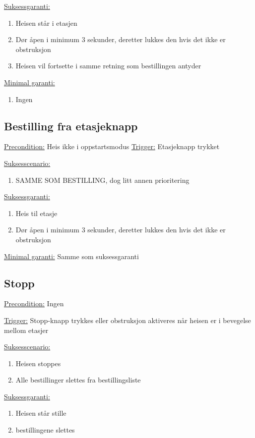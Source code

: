 \documentclass[a4paper]{article}
\begin{document}
\underline{Suksessgaranti:} 
\begin{enumerate}
\item Heisen står i etasjen
\item Dør åpen i minimum 3 sekunder, deretter lukkes den hvis det ikke er obstruksjon
\item Heisen vil fortsette i samme retning som bestillingen antyder
\end{enumerate}

\underline{Minimal garanti:} 
\begin{enumerate}
\item{Ingen}
\end{enumerate}


\subsection*{Bestilling fra etasjeknapp}

\underline{Precondition:} 
Heis ikke i oppstartsmodus
\underline{Trigger:} 
Etasjeknapp trykket

\underline{Suksesscenario:}
\begin{enumerate}
\item SAMME SOM BESTILLING, dog litt annen prioritering
\end{enumerate}

\underline{Suksessgaranti:} 
\begin{enumerate}
\item Heis til etasje
\item Dør åpen i minimum 3 sekunder, deretter lukkes den hvis det ikke er obstruksjon
\end{enumerate}

\underline{Minimal garanti:} 
Samme som suksessgaranti


\subsection*{Stopp}
\underline{Precondition:} 
Ingen

\underline{Trigger:} 
Stopp-knapp trykkes eller obstruksjon aktiveres når heisen er i bevegelse mellom etasjer

\underline{Suksesscenario:}
\begin{enumerate}
\item Heisen stoppes
\item Alle bestillinger slettes fra bestillingsliste
\end{enumerate}

\underline{Suksessgaranti:}
\begin{enumerate}
\item Heisen står stille
\item bestillingene slettes
\end{enumerate}
\end{document}
